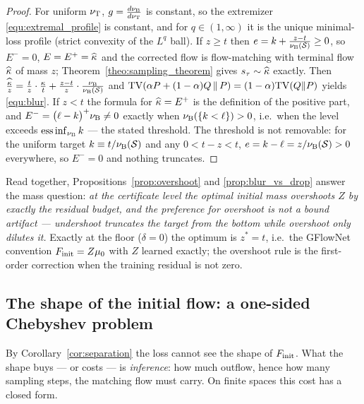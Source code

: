 \begin{proof}
For uniform $\nu_{\mathrm{T}}$, $g=\frac{d\nu_{\mathrm{B}}}{d\nu_{\mathrm{T}}}$ is constant, so the extremizer
\eqref{equ:extremal_profile} is constant, and for $q\in(1,\infty)$ it is the unique
minimal-loss profile (strict convexity of the $L^q$ ball). If $z\geq t$ then
$e=k+\frac{z-t}{\nu_{\mathrm{B}}(\mathcal S)}\geq0$, so $E^-=0$, $E=E^+=\widehat{\kappa}$ and the
corrected flow is flow-matching with terminal flow $\widehat{\kappa}$ of mass $z$;
Theorem~\ref{theo:sampling_theorem} gives $s_\tau\sim\widehat{\kappa}$ exactly. Then
$\frac{\widehat{\kappa}}{z}=\frac tz\cdot\frac{\kappa} t+\frac{z-t}{z}\cdot
\frac{\nu_{\mathrm{B}}}{\nu_{\mathrm{B}}(\mathcal S)}$ and
$\mathrm{TV}(\alpha P+(1-\alpha)Q\,\|\,P)=(1-\alpha)\mathrm{TV}(Q\|P)$ yields \eqref{equ:blur}. If $z<t$
the formula for $\widehat{\kappa}=E^+$ is the definition of the positive part, and
$E^-=\bigl(\ell-k\bigr)^+\nu_{\mathrm{B}}\neq0$ exactly when $\nu_{\mathrm{B}}(\{k<\ell\})>0$, i.e.\ when
the level exceeds $\operatorname*{ess\,inf}_{\nu_{\mathrm{B}}} k$ --- the stated threshold. The
threshold is not removable: for the uniform target $k\equiv t/\nu_{\mathrm{B}}(\mathcal S)$ and
any $0<t-z<t$, $e=k-\ell=z/\nu_{\mathrm{B}}(\mathcal S)>0$ everywhere, so $E^-=0$ and nothing
truncates.
\end{proof}

Read together, Propositions~\ref{prop:overshoot} and \ref{prop:blur_vs_drop} answer the
mass question: \emph{at the certificate level the optimal initial mass overshoots $Z$ by
exactly the residual budget, and the preference for overshoot is not a bound artifact ---
undershoot truncates the target from the bottom while overshoot only dilutes it.} Exactly
at the floor ($\delta=0$) the optimum is $z^*=t$, i.e.\ the GFlowNet convention
$F_{\mathrm{init}}=Z\mu_0$ with $Z$ learned exactly; the overshoot rule is the first-order correction
when the training residual is not zero.

\subsection{The shape of the initial flow: a one-sided Chebyshev problem}\label{sec:shape}

By Corollary~\ref{cor:separation} the loss cannot see the shape of $F_{\mathrm{init}}$. What the shape
buys --- or costs --- is \emph{inference}: how much outflow, hence how many sampling steps,
the matching flow must carry. On finite spaces this cost has a closed form.

